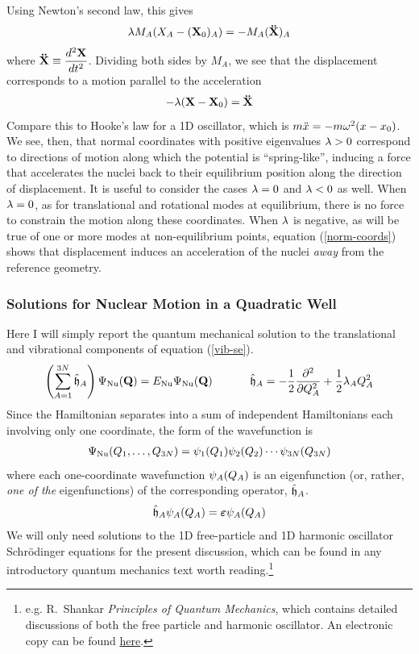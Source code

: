 \documentclass[11pt]{article}
\begin{document}
Using Newton's second law, this gives
\begin{align*}
%
	\la
	M_A
	(X_A-(\bo{X}_0)_A)
=
-
	M_A
	(\bo{\ddot{X}})_A
\end{align*}
where $\mathbf{\ddot{X}}\equiv \dfrac{d^2\mathbf{X}}{dt^2}$.
Dividing both sides by $M_A$, we see that the displacement corresponds to a motion parallel to the acceleration
\begin{align}
\label{norm-coords}
-
	\la
	(\bo{X}-\bo{X}_0)
=
%
	\bo{\ddot{X}}
\end{align}
Compare this to Hooke's law for a 1D oscillator, which is $m\ddot{x}=-m\omega^2(x-x_0)$.
We see, then, that normal coordinates with positive eigenvalues $\lambda>0$ correspond to directions of motion along which the potential is ``spring-like'', inducing a force that accelerates the nuclei back to their equilibrium position along the direction of displacement.
It is useful to consider the cases $\lambda=0$ and $\lambda<0$ as well.
When $\lambda=0$, as for translational and rotational modes at equilibrium, there is no force to constrain the motion along these coordinates.
When $\lambda$ is negative, as will be true of one or more modes at non-equilibrium points, equation (\ref{norm-coords}) shows that displacement induces an acceleration of the nuclei {\it away} from the reference geometry.


\subsubsection{Solutions for Nuclear Motion in a Quadratic Well}
Here I will simply report the quantum mechanical solution to the translational and vibrational components of equation (\ref{vib-se}).
\begin{align*}
\left(\sum_{A=1}^{3N}
	\hat{\mathfrak{h}}_A \right)
	\Psi_{\mathrm{Nu}}(\mathbf{Q})
=
	E_{\mathrm{Nu}}
	\Psi_{\mathrm{Nu}}(\mathbf{Q})
\ \ \ \ \ \ \ \ \ \ 
	\hat{\mathfrak{h}}_A
=
-\dfrac{1}{2}
	 \dfrac{ \partial^{2}  }{\partial Q_A ^{2}}
+\dfrac{1}{2}
	\lambda_A Q_A^2
\end{align*}
Since the Hamiltonian separates into a sum of independent Hamiltonians each involving only one coordinate, the form of the wavefunction is
\begin{align}
	\Psi_{\mathrm{Nu}}(Q_1,\ldots,Q_{3N})
=
	\psi_1(Q_1)
	\psi_2(Q_2)
	\cdots
	\psi_{3N}(Q_{3N})
\end{align}
where each one-coordinate wavefunction $\psi_A(Q_A)$ is an eigenfunction (or, rather, {\it one of the} eigenfunctions) of the corresponding operator, $\hat{\mathfrak{h}}_A$.
\begin{align}
	\hat{\mathfrak{h}}_A
	\psi_A(Q_A)
=
	\bm\varepsilon
	\psi_A(Q_A)
\end{align}
We will only need solutions to the 1D free-particle and 1D harmonic oscillator Schr\"odinger equations for the present discussion, which can be found in any introductory quantum mechanics text worth reading.\footnote{e.g. R.\ Shankar {\it Principles of Quantum Mechanics}, which contains detailed discussions of both the free particle and harmonic oscillator. An electronic copy can be found \href{http://home.basu.ac.ir/\~psu/Books/\%5BRamamurti_Shankar\%5D_Principles_of_Quantum_Mechanic\%28BookFi.org\%29.pdf}{here}.}
\end{document}
